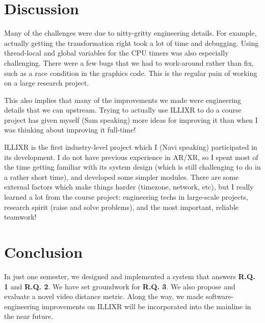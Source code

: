 \section{Discussion}

Many of the challenges were due to nitty-gritty engineering details. For example, actually getting the transformation right took a lot of time and debugging. Using thread-local and global variables for the CPU timers was also especially challenging. There were a few bugs that we had to work-around rather than fix, such as a race condition in the graphics code. This is the regular pain of working on a large research project.

This also implies that many of the improvements we made were engineering details that we can upstream. Trying to actually use ILLIXR to do a course project has given myself (Sam speaking) more ideas for improving it than when I was thinking about improving it full-time!

ILLIXR is the first industry-level project which I (Navi speaking) participated in its development. I do not have previous experience in AR/XR, so I spent most of the time getting familiar with its system design (which is still challenging to do in a rather short time), and developed some simpler modules. There are some external factors which make things harder (timezone, network, etc), but I really learned a lot from the course project: engineering techs in large-scale projects, research spirit (raise and solve problems), and the most important, reliable teamwork!

\section{Conclusion}

In just one semester, we designed and implemented a system that answers \textbf{R.Q. 1} and \textbf{R.Q. 2}. We have set groundwork for \textbf{R.Q. 3}. We also propose and evaluate a novel video distance metric. Along the way, we made software-engineering improvements on ILLIXR will be incorporated into the mainline in the near future.
